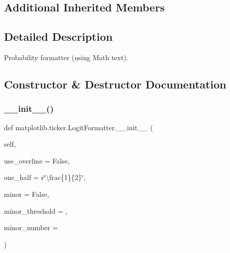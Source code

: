 \subsection*{Additional Inherited Members}


\subsection{Detailed Description}
\begin{DoxyVerb}Probability formatter (using Math text).
\end{DoxyVerb}
 

\subsection{Constructor \& Destructor Documentation}
\mbox{\label{classmatplotlib_1_1ticker_1_1LogitFormatter_a2183bcd411372f9df66cd49fad3ccca7}} 
\subsubsection{\texorpdfstring{\+\_\+\+\_\+init\+\_\+\+\_\+()}{\_\_init\_\_()}}
{\footnotesize\ttfamily def matplotlib.\+ticker.\+Logit\+Formatter.\+\_\+\+\_\+init\+\_\+\+\_\+ (\begin{DoxyParamCaption}\item[{}]{self,  }\item[{}]{use\+\_\+overline = {\ttfamily False},  }\item[{}]{one\+\_\+half = {\ttfamily r\char`\"{}\textbackslash{}frac\{1\}\{2\}\char`\"{}},  }\item[{}]{minor = {\ttfamily False},  }\item[{}]{minor\+\_\+threshold = {},  }\item[{}]{minor\+\_\+number = {} }\end{DoxyParamCaption})}

